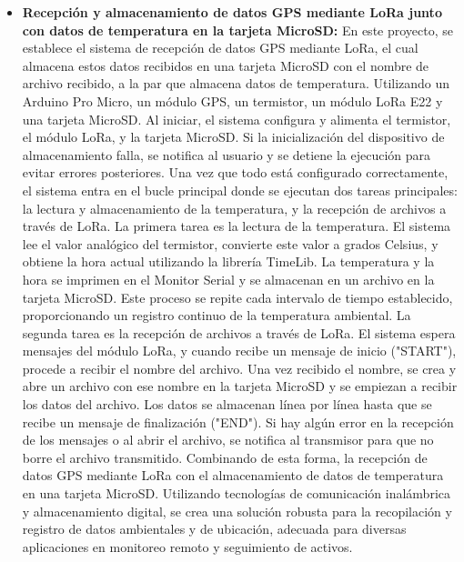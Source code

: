 \begin{itemize}
	\item \textbf{Recepción y almacenamiento de datos GPS mediante LoRa junto con datos de temperatura en la tarjeta MicroSD:} En este proyecto, se establece el sistema de recepción de datos GPS mediante LoRa, el cual almacena estos datos recibidos en una tarjeta MicroSD con el nombre de archivo recibido, a la par que almacena datos de temperatura. Utilizando un Arduino Pro Micro, un módulo GPS, un termistor, un módulo LoRa E22 y una tarjeta MicroSD.
	Al iniciar, el sistema configura y alimenta el termistor, el módulo LoRa, y la tarjeta MicroSD. Si la inicialización del dispositivo de almacenamiento falla, se notifica al usuario y se detiene la ejecución para evitar errores posteriores. Una vez que todo está configurado correctamente, el sistema entra en el bucle principal donde se ejecutan dos tareas principales: la lectura y almacenamiento de la temperatura, y la recepción de archivos a través de LoRa.
	La primera tarea es la lectura de la temperatura. El sistema lee el valor analógico del termistor, convierte este valor a grados Celsius, y obtiene la hora actual utilizando la librería TimeLib. La temperatura y la hora se imprimen en el Monitor Serial y se almacenan en un archivo en la tarjeta MicroSD. Este proceso se repite cada intervalo de tiempo establecido, proporcionando un registro continuo de la temperatura ambiental.
	La segunda tarea es la recepción de archivos a través de LoRa. El sistema espera mensajes del módulo LoRa, y cuando recibe un mensaje de inicio ("START"), procede a recibir el nombre del archivo. Una vez recibido el nombre, se crea y abre un archivo con ese nombre en la tarjeta MicroSD y se empiezan a recibir los datos del archivo. Los datos se almacenan línea por línea hasta que se recibe un mensaje de finalización ("END"). Si hay algún error en la recepción de los mensajes o al abrir el archivo, se notifica al transmisor para que no borre el archivo transmitido.
	Combinando de esta forma, la recepción de datos GPS mediante LoRa con el almacenamiento de datos de temperatura en una tarjeta MicroSD. Utilizando tecnologías de comunicación inalámbrica y almacenamiento digital, se crea una solución robusta para la recopilación y registro de datos ambientales y de ubicación, adecuada para diversas aplicaciones en monitoreo remoto y seguimiento de activos.
	

\end{itemize}
